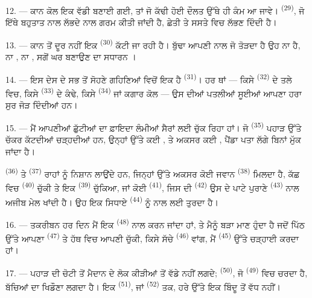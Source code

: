 12. --- ਕਾਨ ਕੋਲ ਇਕ ਵੱਡੀ  ਬਣਾਈ ਗਈ, ਤਾਂ ਜੋ ਕੱਢੀ ਹੋਈ ਦੌਲਤ ਉੱਥੇ
ਹੀ ਕੰਮ ਆ ਜਾਵੇ।  \textsuperscript{(29)}, ਜੋ ਇੱਥੇ ਬਹੁਤਾਤ ਨਾਲ ਲੱਭਦੇ
 ਨਾਲ ਗਰਮ ਕੀਤੀ ਜਾਂਦੀ ਹੈ, ਛੇਤੀ ਤੇ ਸਸਤੇ ਵਿਚ  ਲੱਭਣ
ਦਿੰਦੀ ਹੈ।

13. --- ਕਾਨ ਤੋਂ ਦੂਰ ਨਹੀਂ ਇਕ  \textsuperscript{(30)} ਕੱਟੀ ਜਾ ਰਹੀ ਹੈ।
ਬੁੱਢਾ  ਆਪਣੀ  ਨਾਲ ਜੋ ਤੋੜਦਾ ਹੈ ਉਹ ਨਾ
 ਹੈ, ਨਾ , ਨਾ , ਸਗੋਂ ਘਰ ਬਣਾਉਣ
ਦਾ ਸਧਾਰਨ ।

14. --- ਇਸ ਦੇਸ ਦੇ ਸਭ ਤੋਂ ਸੋਹਣੇ ਗਹਿਣਿਆਂ ਵਿਚੋਂ ਇਕ ਹੈ 
\textsuperscript{(31)}। ਹਰ ਥਾਂ — ਕਿਸੇ  \textsuperscript{(32)} ਦੇ ਤਲੇ
ਵਿਚ, ਕਿਸੇ  \textsuperscript{(33)} ਦੇ ਕੰਢੇ, ਕਿਸੇ 
\textsuperscript{(34)} ਜਾਂ ਕਗਾਰ ਕੋਲ — ਉਸ ਦੀਆਂ ਪਤਲੀਆਂ ਸੂਈਆਂ ਆਪਣਾ ਹਰਾ ਸੁਰ ਜੋੜ
ਦਿੰਦੀਆਂ ਹਨ।

\VUsaut{3.0mm}
\VUsaut{3.0mm}

15. --- ਮੈਂ ਆਪਣੀਆਂ ਛੁੱਟੀਆਂ ਦਾ ਫ਼ਾਇਦਾ ਲੰਮੀਆਂ ਸੈਰਾਂ ਲਈ ਚੁੱਕ ਰਿਹਾ ਹਾਂ। ਜੋ
 \textsuperscript{(35)} ਪਹਾੜ ਉੱਤੇ ਚੱਕਰ ਕੱਟਦੀਆਂ ਚੜ੍ਹਦੀਆਂ ਹਨ,
ਉਨ੍ਹਾਂ ਉੱਤੇ ਕਈ , ਤੇ ਅਕਸਰ ਕਈ , ਪੈਂਡਾ ਪਤਾ ਲੱਗੇ ਬਿਨਾਂ
ਮੁੱਕ ਜਾਂਦਾ ਹੈ।

 \textsuperscript{(36)} ਤੇ 
\textsuperscript{(37)} ਰਾਹਾਂ ਨੂੰ ਨਿਸ਼ਾਨ ਲਾਉਂਦੇ ਹਨ, ਜਿਨ੍ਹਾਂ ਉੱਤੇ ਅਕਸਰ ਕੋਈ ਜਵਾਨ
 \textsuperscript{(38)} ਮਿਲਦਾ ਹੈ, ਕੱਛ ਵਿਚ 
\textsuperscript{(40)} ਚੁੱਕੀ ਤੇ ਇਕ  \textsuperscript{(39)} ਚੁੱਕਿਆ,
ਜਾਂ ਕੋਈ  \textsuperscript{(41)}, ਜਿਸ ਦੀ 
\textsuperscript{(42)} ਉਸ ਦੇ ਪਾਟੇ ਪੁਰਾਣੇ  \textsuperscript{(43)} ਨਾਲ
ਅਜੀਬ ਮੇਲ ਖਾਂਦੀ ਹੈ। ਉਹ ਇਕ ਸਿਧਾਏ  \textsuperscript{(44)} ਨੂੰ
 ਨਾਲ ਲਈ ਤੁਰਦਾ ਹੈ।

\VUsaut{3.0mm}

16. --- ਤਕਰੀਬਨ ਹਰ ਦਿਨ ਮੈਂ ਇਕ  \textsuperscript{(48)} ਨਾਲ
 ਕਰਨ ਜਾਂਦਾ ਹਾਂ, ਤੇ ਮੈਨੂੰ ਬੜਾ ਮਾਣ ਹੁੰਦਾ ਹੈ ਜਦੋਂ ਪਿੱਠ ਉੱਤੇ ਆਪਣਾ
 \textsuperscript{(47)} ਤੇ ਹੱਥ ਵਿਚ ਆਪਣੀ  ਚੁੱਕੀ, ਕਿਸੇ
ਸੱਚੇ  \textsuperscript{(46)} ਵਾਂਗ, ਮੈਂ 
\textsuperscript{(45)} ਉੱਤੇ ਚੜ੍ਹਾਈ ਕਰਦਾ ਹਾਂ।

17. --- ਪਹਾੜ ਦੀ ਚੋਟੀ ਤੋਂ ਮੈਦਾਨ ਦੇ ਲੋਕ ਕੀੜੀਆਂ ਤੋਂ ਵੱਡੇ ਨਹੀਂ ਲਗਦੇ;
 \textsuperscript{(50)}, ਜੋ 
\textsuperscript{(49)} ਵਿਚ ਚਰਦਾ ਹੈ, ਬੱਚਿਆਂ ਦਾ ਖਿਡੌਣਾ ਲਗਦਾ ਹੈ। ਇਕ 
\textsuperscript{(51)}, ਜਾਂ  \textsuperscript{(52)} ਤਕ, ਹਰੇ
ਉੱਤੇ ਇਕ ਬਿੰਦੂ ਤੋਂ ਵੱਧ ਨਹੀਂ।

